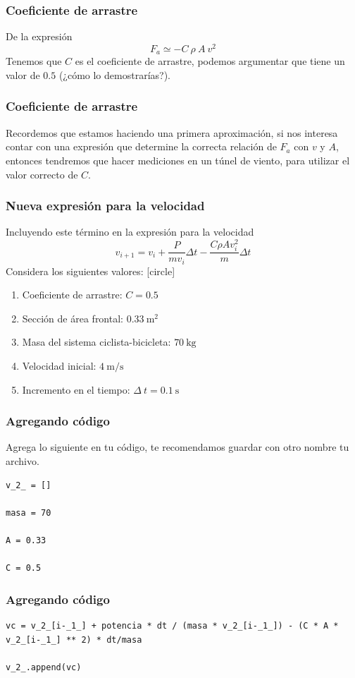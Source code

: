 \begin{frame}
\frametitle{Coeficiente de arrastre}
De la expresión
\[ F_{a} \simeq - C \: \rho \: A \: v^{2} \]
Tenemos que $C$ es el coeficiente de arrastre, podemos argumentar que tiene un valor de $0.5$ (¿cómo lo demostrarías?).
\end{frame}
\begin{frame}
\frametitle{Coeficiente de arrastre}
Recordemos que estamos haciendo una primera aproximación, si nos interesa contar con una expresión que determine la correcta relación de $F_{a}$ con $v$ y $A$, entonces tendremos que hacer mediciones en un túnel de viento, para utilizar el valor correcto de $C$.
\end{frame}
\begin{frame}
\frametitle{Nueva expresión para la velocidad}
Incluyendo este término en la expresión para la velocidad
\begin{equation}\label{Eqvelifriccion}
v_{i+1} = v_{i} + \dfrac{P}{m v_{i}} \Delta t - \dfrac{C \rho A v_{i}^{2}}{m} \Delta t
\end{equation}
Considera los siguientes valores:
[circle]
\begin{enumerate}[<+->]
\item Coeficiente de arrastre: $C = 0.5$
\item Sección de área frontal: $0.33 \: \si{\square\meter}$
\item Masa del sistema ciclista-bicicleta: $70 \: \si{\kilogram}$
\item Velocidad inicial: $4 \: \si{\meter\per\second}$
\item Incremento en el tiempo: $\Delta \: t = 0.1 \: \si{\second}$
\end{enumerate}
\end{frame}
\begin{frame}[fragile]
\frametitle{Agregando código}
Agrega lo siguiente en tu código, te recomendamos guardar con otro nombre tu archivo.
\begin{lstlisting}[caption=Valores para el caso con fricción, style=FormattedNumber, basicstyle=\linespread{1.1}\ttfamily=\small, columns=fullflexible]
v_2_ = []

masa = 70

A = 0.33

C = 0.5
\end{lstlisting}
\end{frame}
\begin{frame}[fragile]
\frametitle{Agregando código}
\begin{lstlisting}[caption=En el ciclo \texttt{for ... in}, style=FormattedNumber, basicstyle=\linespread{1.1}\ttfamily=\small, columns=fullflexible]
vc = v_2_[i-_1_] + potencia * dt / (masa * v_2_[i-_1_]) - (C * A * v_2_[i-_1_] ** 2) * dt/masa
    
v_2_.append(vc)
\end{lstlisting}
\end{frame}
